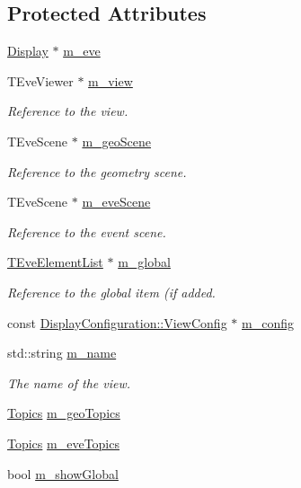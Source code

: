 \subsection*{Protected Attributes}
\begin{DoxyCompactItemize}
\item 
\hyperlink{class_d_d4hep_1_1_display}{Display} $\ast$ \hyperlink{class_d_d4hep_1_1_view_a3ec453c7124cf0d8347acd0b0d2febb5}{m\+\_\+eve}
\item 
T\+Eve\+Viewer $\ast$ \hyperlink{class_d_d4hep_1_1_view_a6792e4acf7d115519d5390959e7c0306}{m\+\_\+view}
\begin{DoxyCompactList}\small\item\em Reference to the view. \end{DoxyCompactList}\item 
T\+Eve\+Scene $\ast$ \hyperlink{class_d_d4hep_1_1_view_a26d377786acafb43d0fccf8752d2bd79}{m\+\_\+geo\+Scene}
\begin{DoxyCompactList}\small\item\em Reference to the geometry scene. \end{DoxyCompactList}\item 
T\+Eve\+Scene $\ast$ \hyperlink{class_d_d4hep_1_1_view_ae1010f3e7f65ecc82f47cb160a8839c0}{m\+\_\+eve\+Scene}
\begin{DoxyCompactList}\small\item\em Reference to the event scene. \end{DoxyCompactList}\item 
\hyperlink{class_t_eve_element_list}{T\+Eve\+Element\+List} $\ast$ \hyperlink{class_d_d4hep_1_1_view_a6faa3880d28177952c6aad166327397a}{m\+\_\+global}
\begin{DoxyCompactList}\small\item\em Reference to the global item (if added. \end{DoxyCompactList}\item 
const \hyperlink{class_d_d4hep_1_1_display_configuration_1_1_view_config}{Display\+Configuration\+::\+View\+Config} $\ast$ \hyperlink{class_d_d4hep_1_1_view_aa661c16c213fd41f49039a8c0e0a96c9}{m\+\_\+config}
\item 
std\+::string \hyperlink{class_d_d4hep_1_1_view_ac43b9e8f976a9731ff808cd6f7fc1ce7}{m\+\_\+name}
\begin{DoxyCompactList}\small\item\em The name of the view. \end{DoxyCompactList}\item 
\hyperlink{class_d_d4hep_1_1_view_aac8510a8567e5e9128020fd81d8f57de}{Topics} \hyperlink{class_d_d4hep_1_1_view_a43c344306103039f764355833cee51c7}{m\+\_\+geo\+Topics}
\item 
\hyperlink{class_d_d4hep_1_1_view_aac8510a8567e5e9128020fd81d8f57de}{Topics} \hyperlink{class_d_d4hep_1_1_view_a6d3c5e7719c79fc50b50f575924b5bf5}{m\+\_\+eve\+Topics}
\item 
bool \hyperlink{class_d_d4hep_1_1_view_ab3ae217421de575d8db2a4eed72b8629}{m\+\_\+show\+Global}
\end{DoxyCompactItemize}


